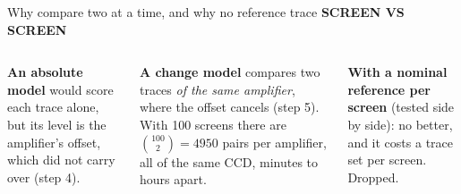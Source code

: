 \documentclass[aspectratio=169,11pt]{beamer}
\newcommand{\eyebrow}[2][trace]{{\color{#1}\scriptsize\bfseries\MakeUppercase{#2}}\par\vspace{0.1em}}
\begin{document}
\begin{frame}{Why compare two at a time, and why no reference trace}
\eyebrow{Screen vs screen}
\begin{columns}[T]
\small
\textbf{An absolute model} would score each trace alone, but its level is the amplifier's offset, which did not carry over (step 4).\par\medskip
\textbf{A change model} compares two traces \emph{of the same amplifier}, where the offset cancels (step 5). With 100 screens there are $\binom{100}{2}=4950$ pairs per amplifier, all of the same CCD, minutes to hours apart.\par\medskip
\textbf{With a nominal reference per screen} (tested side by side): no better, and it costs a trace set per screen. Dropped.
\centering
{}
\end{columns}
\end{frame}
\end{document}

